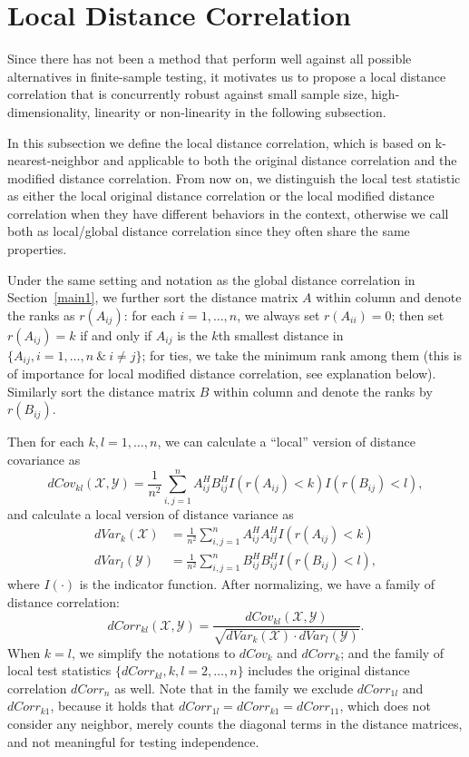 \documentclass[11pt]{article}
\begin{document}
\section{Local Distance Correlation}
\label{main2}

Since there has not been a method that perform well against all possible alternatives in finite-sample testing, it motivates us to propose a local distance correlation that is concurrently robust against small sample size, high-dimensionality, linearity or non-linearity in the following subsection.


In this subsection we define the local distance correlation, which is based on k-nearest-neighbor and applicable to both the original distance correlation and the modified distance correlation. From now on, we distinguish the local test statistic as either the local original distance correlation or the local modified distance correlation when they have different behaviors in the context, otherwise we call both as local/global distance correlation since they often share the same properties.

Under the same setting and notation as the global distance correlation in Section~\ref{main1}, we further sort the distance matrix $A$ within column and denote the ranks as $r(A_{ij})$: for each $i=1, \ldots, n$, we always set $r(A_{ii})=0$; then set $r(A_{ij})=k$ if and only if $A_{ij}$ is the $k$th smallest distance in $\{A_{ij}, i=1,\ldots,n\ \& \ i \neq j\}$; for ties, we take the minimum rank among them (this is of importance for local modified distance correlation, see explanation below). Similarly sort the distance matrix $B$ within column and denote the ranks by $r(B_{ij})$.

Then for each $k,l=1,\ldots,n$, we can calculate a ``local'' version of distance covariance as
\begin{equation}
\label{localdCovEqu}
dCov_{kl}(\mathcal{X},\mathcal{Y})=\frac{1}{n^2}\sum_{i,j=1}^{n}A^{H}_{ij}B^{H}_{ij}I(r(A_{ij})<k)I(r(B_{ij})<l),
\end{equation}
and calculate a local version of distance variance as
\begin{align*}
dVar_{k}(\mathcal{X}) &=\frac{1}{n^2}\sum_{i,j=1}^{n}A^{H}_{ij}A^{H}_{ij}I(r(A_{ij})<k)\\
dVar_{l}(\mathcal{Y}) &=\frac{1}{n^2}\sum_{i,j=1}^{n}B^{H}_{ij}B^{H}_{ij}I(r(B_{ij})<l),
\end{align*}
where $I(\cdot)$ is the indicator function. After normalizing, we have a family of distance correlation:
\begin{equation}
\label{localdCorrEqu}
dCorr_{kl}(\mathcal{X},\mathcal{Y})=\frac{dCov_{kl}(\mathcal{X},\mathcal{Y})}{\sqrt{dVar_{k}(\mathcal{X}) \cdot dVar_{l}(\mathcal{Y})}}.
\end{equation}
When $k=l$, we simplify the notations to $dCov_{k}$ and $dCorr_{k}$; and the family of local test statistics $\{dCorr_{kl}, k,l=2,\ldots,n\}$ includes the original distance correlation $dCorr_{n}$ as well. Note that in the family we exclude $dCorr_{1l}$ and $dCorr_{k1}$, because it holds that $dCorr_{1l}=dCorr_{k1}=dCorr_{11}$, which does not consider any neighbor, merely counts the diagonal terms in the distance matrices, and not meaningful for testing independence.
\end{document}
